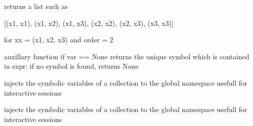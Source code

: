 \documentclass[letterpaper,10pt,english]{sphinxmanual}
\begin{document}

\begin{fulllineitems}
\label{pycontroltools:auxfuncs.programming.miscprog.get_diffterms}
returns a list such as

{[}(x1, x1), (x1, x2), (x1, x3), (x2, x2), (x2, x3), (x3, x3){]}

for xx = (x1, x2, x3) and order = 2

\end{fulllineitems}


\begin{fulllineitems}
\label{pycontroltools:auxfuncs.programming.miscprog.get_expr_var}
auxillary function
if var == None returns the unique symbol which is contained in expr:
if no symbol is found, returns None

\end{fulllineitems}


\begin{fulllineitems}
\label{pycontroltools:auxfuncs.programming.miscprog.makeGlobal}
injects the symbolic variables of a collection to the global namespace
usefull for interactive sessions

\end{fulllineitems}


\begin{fulllineitems}
\label{pycontroltools:auxfuncs.programming.miscprog.make_global}
injects the symbolic variables of a collection to the global namespace
usefull for interactive sessions

\end{fulllineitems}

\end{document}

